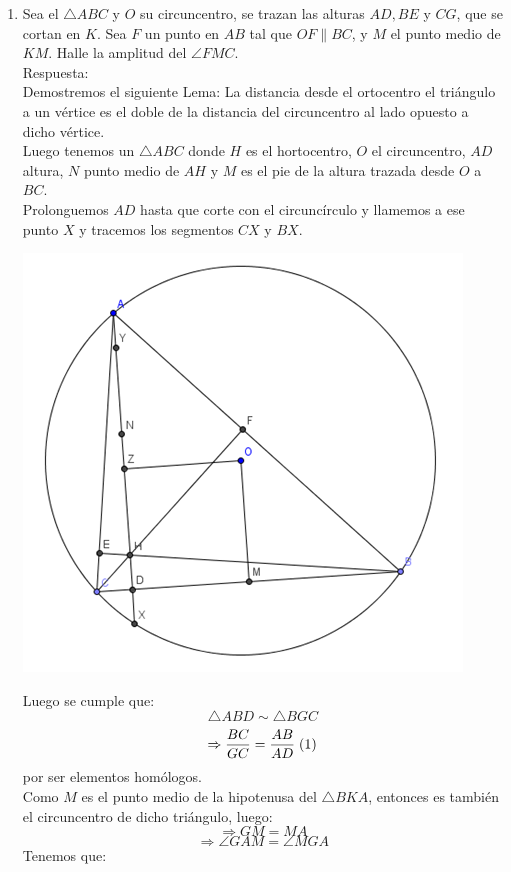 \documentclass{book}
\begin{document}
\begin{enumerate}
        \item Sea el $\triangle ABC$  y $O$ su circuncentro, se trazan las alturas $AD, BE$ y $CG$, que se cortan en $K$. Sea $F$ un punto en $AB$ tal que $OF \| BC$, y $M$ el punto medio de $KM$. Halle la amplitud del $\angle FMC$.\\
        Respuesta:\\
        Demostremos el siguiente Lema:
        La distancia desde el ortocentro el triángulo a un vértice es el doble de la distancia del circuncentro al lado opuesto a dicho vértice.\\
        Luego tenemos un $\triangle ABC$ donde $H$ es el hortocentro, $O$ el circuncentro, $AD$ altura, $N$ punto medio de $AH$ y $M$ es el pie de la altura trazada desde $O$ a $BC$.\\
        Prolonguemos $AD$ hasta que corte con el circuncírculo y llamemos a ese punto $X$ y tracemos los segmentos $CX$ y $BX$.
        \begin{center}
            \includegraphics[scale=1]{imagenes/Geometria/21,1.png}
        \end{center}
        Luego se cumple que:
        $$\triangle ABD\sim\triangle BGC$$
        $$\Rightarrow{BC\over GC}={AB\over AD} \; (1)$$
        por ser elementos homólogos.\\
        Como $M$ es el punto medio de la hipotenusa del $\triangle BKA$, entonces es también el circuncentro de dicho triángulo, luego:
        $$\Rightarrow GM=MA$$
        $$\Rightarrow\angle GAM=\angle MGA$$
        Tenemos que:

\end{enumerate}
\end{document}
